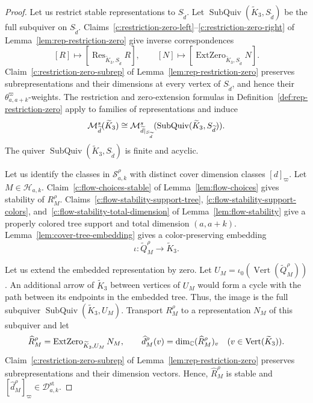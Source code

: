 \begin{proof}
Let us restrict stable representations to $S_{\widetilde d}$.
Let $\operatorname{SubQuiv}(\widetilde K_3,S_{\widetilde d})$ be the full subquiver on $S_{\widetilde d}$.
Claims~\ref{c:restriction-zero-left}--\ref{c:restriction-zero-right} of Lemma~\ref{lem:rep-restriction-zero} give inverse correspondences
\[
 [R]\longmapsto[\operatorname{Res}_{\widetilde K_3,S_{\widetilde d}}R],\qquad
 [N]\longmapsto[\operatorname{ExtZero}_{\widetilde K_3,S_{\widetilde d}}N].
\]
Claim~\ref{c:restriction-zero-subrep} of Lemma~\ref{lem:rep-restriction-zero} preserves subrepresentations and their dimensions at every vertex of $S_{\widetilde d}$, and hence their $\theta^{\varpi}_{a,a+k}$-weights.
The restriction and zero-extension formulas in Definition~\ref{def:rep-restriction-zero} apply to families of representations and induce
\begin{equation}\label{eq:cover-finite-support-moduli}
 \mathcal M^s_{\widetilde d}(\widetilde K_3)
 \cong\mathcal M^s_{\widetilde d|_{S_{\widetilde d}}}(\operatorname{SubQuiv}(\widetilde K_3,S_{\widetilde d})).
\end{equation}
The quiver $\operatorname{SubQuiv}(\widetilde K_3,S_{\widetilde d})$ is finite and acyclic.

Let us identify the classes in $\mathcal S_{a,k}^\rho$ with distinct cover dimension classes $[d]_{\varpi}$.
Let $M\in\mathcal H_{a,k}$.
Claim~\ref{c:flow-choices-stable} of Lemma~\ref{lem:flow-choices} gives stability of $R_M^\rho$.
Claims~\ref{c:flow-stability-support-tree}, \ref{c:flow-stability-support-colors}, and~\ref{c:flow-stability-total-dimension} of Lemma~\ref{lem:flow-stability} give a properly colored tree support and total dimension $(a,a+k)$.
Lemma~\ref{lem:cover-tree-embedding} gives a color-preserving embedding
\[
 \iota:\widetilde Q_M^\rho\longrightarrow\widetilde K_3.
\]

Let us extend the embedded representation by zero.
Let $U_M=\iota_0(\operatorname{Vert}(\widetilde Q_M^\rho))$.
An additional arrow of $\widetilde K_3$ between vertices of $U_M$ would form a cycle with the path between its endpoints in the embedded tree.
Thus, the image is the full subquiver $\operatorname{SubQuiv}(\widetilde K_3,U_M)$.
Transport $R_M^\rho$ to a representation $N_M$ of this subquiver and let
\[
 \widehat R_M^\rho=\operatorname{ExtZero}_{\widetilde K_3,U_M}N_M,\qquad
 \widehat d_M^\rho(v)=\dim_{\mathbb C}(\widehat R_M^\rho)_v
 \quad(v\in\operatorname{Vert}(\widetilde K_3)).
\]
Claim~\ref{c:restriction-zero-subrep} of Lemma~\ref{lem:rep-restriction-zero} preserves subrepresentations and their dimension vectors.
Hence, $\widehat R_M^\rho$ is stable and $[\widehat d_M^\rho]_{\varpi}\in\mathcal D^{\mathrm{st}}_{a,k}$.


\end{proof}
